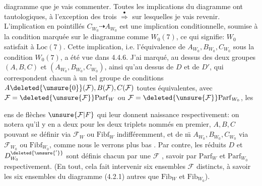 
diagramme que je vais commenter. Toutes les implications  du diagramme ont  tautologiques, à l'exception des trois $\overset{\bullet}{\Longrightarrow}$ sur lesquelles je vais revenir. L'implication en pointillés $C_{W_0}\dashrightarrow A_{W_0}$ est une implication conditionnelle, soumise à la condition marquée sur le diagramme comme $W_0(7)$, ce qui signifie: $W_0$ satisfait à $\mathrm{Loc}(7)$. Cette implication, i.e. l'équivalence de $A_{W_0},B_{W_0},C_{W_0}$ sous la condition $W_0(7)$, a été vue dans 4.4.6. J'ai marqué, au dessus des deux groupes $(A,B,C)$ et $(A_{W_0},B_{W_0},C_{W_0})$, ainsi qu'au dessus de $D$ et de $D'$, qui correspondent chacun à un tel groupe de conditions $A\deleted{\unsure{0}}(\mathcal{F}),B(\mathcal{F}),C(\mathcal{F})$ toutes équivalentes, avec $\mathcal{F}=\deleted{\unsure{\mathcal{F}}}\mathrm{Parf}_{W}$ ou $\mathcal{F}=\deleted{\unsure{\mathcal{F}}}\mathrm{Parf}_{W_0}$\unsure{),}, les

ens de flèches $\unsure{\mathcal{F}|F}$ qui leur donnent naissance respectivement: on notera qu'il y en a deux pour les deux triplets nommés en premier, $A,B,C$ pouvant se définir via $\mathcal{F}_{W}$ ou $\mathrm{Fibf}_{W}$ indifféremment, et de \={m} $A_{W_0},B_{W_0},C_{W_0}$ via $\mathcal{F}_{W_0}$ ou $\mathrm{Fibf}_{W_0}$, comme  nous le verrons plus bas . Par contre, les   réduits $D$ et $D^{\deleted{\unsure{'}}}_{W_0}$ sont définis chacun par  une $\mathcal{F}$ , savoir par $\mathrm{Parf}_{W}$ et $\mathrm{Parf}_{W_0}$ respectivement. (En tout, cela fait intervenir six ensembles $\mathcal{F}$ distincts, à savoir les six ensembles du diagramme (4.2.1) autres que $\mathrm{Fib}_{W}$ et $\mathrm{Fib}_{W_0}$).

